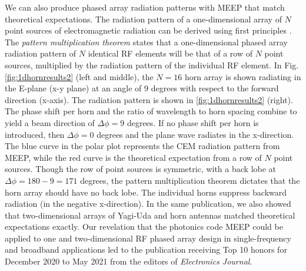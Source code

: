 \documentclass[../../main.tex]{subfiles}
\begin{document}
We can also produce phased array radiation patterns with MEEP that match theoretical expectations.  The radiation pattern of a one-dimensional array of $N$ point sources of electromagnetic radiation can be derived using first principles \cite{electronics10040415}.  The \textit{pattern multiplication theorem} states that a one-dimensional phased array radiation pattern of $N$ identical RF elements will be that of a row of $N$ point sources, multiplied by the radiation pattern of the individual RF element.  In Fig. \ref{fig:1dhornresults2} (left and middle), the $N=16$ horn array is shown radiating in the E-plane (x-y plane) at an angle of 9 degrees with respect to the forward direction (x-axis).  The radiation pattern is shown in \ref{fig:1dhornresults2} (right).  The phase shift per horn and the ratio of wavelength to horn spacing combine to yield a beam direction of $\Delta \phi = 9$ degrees.  If no phase shift per horn is introduced, then $\Delta \phi = 0$ degrees and the plane wave radiates in the x-direction.  The blue curve in the polar plot represents the CEM radiation pattern from MEEP, while the red curve is the theoretical expectation from a row of $N$ point sources.  Though the row of point sources is symmetric, with a back lobe at $\Delta \phi = 180 - 9 = 171$ degrees, the pattern multiplication theorem dictates that the horn array should have no back lobe.  The individual horns suppress backward radiation (in the negative x-direction).  In the same publication, we also showed that two-dimensional arrays of Yagi-Uda and horn antennas matched theoretical expectations exactly.  Our revelation that the photonics code MEEP could be applied to one and two-dimensional RF phased array design in single-frequency and broadband applications led to the publication receiving Top 10 honors for December 2020 to May 2021 from the editors of \textit{Electronics Journal}.
\end{document}
